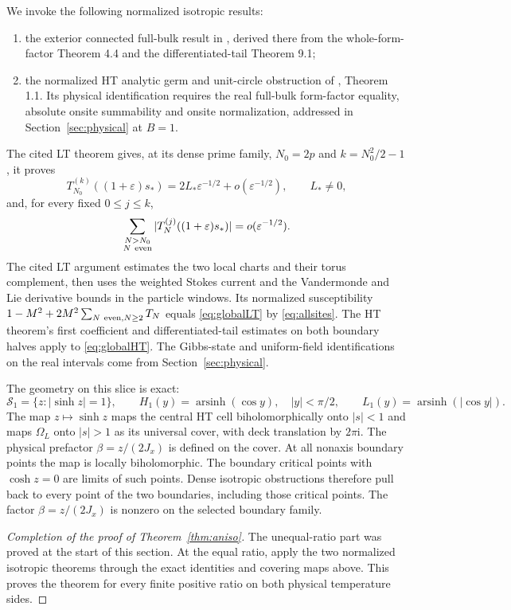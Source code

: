 \documentclass[11pt]{article}
\numberwithin{equation}{section}
\theoremstyle{definition}
\newcommand{\ii}{\mathrm i}
\newcommand{\eps}{\varepsilon}
\newcommand{\cS}{\mathcal S}
\newcommand{\OL}{\Omega_L}
\begin{document}
We invoke the following normalized isotropic results:
\begin{enumerate}
\item the exterior connected full-bulk result in
\cite[Corollary 9.3]{LTsource}, derived there from the
whole-form-factor Theorem 4.4 and the differentiated-tail Theorem 9.1;
\item the normalized HT analytic germ and unit-circle obstruction of
\cite{HTsource}, Theorem 1.1. Its physical identification requires the
real full-bulk form-factor equality, absolute onsite summability and
onsite normalization, addressed in Section~\ref{sec:physical} at $B=1$.
\end{enumerate}
The cited LT theorem gives, at its dense prime family,
$N_0=2p$ and $k=N_0^2/2-1$, it proves
\[
 T_{N_0}^{(k)}((1+\eps)s_*)
 =2L_*\eps^{-1/2}+o(\eps^{-1/2}),\qquad L_*\ne0,
\]
and, for every fixed $0\le j\le k$,
\[
 \sum_{\substack{N>N_0\\N\ {\rm even}}}
 |T_N^{(j)}((1+\eps)s_*)|=o(\eps^{-1/2}).
\]
The cited LT argument estimates the two local charts and their torus
complement, then uses the weighted Stokes current and the
Vandermonde and Lie derivative bounds in the particle windows.
Its normalized susceptibility
$1-M^2+2M^2\sum_{N\ {\rm even},N\ge2}T_N$ equals
\eqref{eq:globalLT} by \eqref{eq:allsites}. The HT theorem's first
coefficient and differentiated-tail estimates on both boundary halves
apply to \eqref{eq:globalHT}. The Gibbs-state and uniform-field
identifications on the real intervals come from
Section~\ref{sec:physical}.

The geometry on this slice is exact:
\[
 \cS_1=\{z:|\sinh z|=1\},\qquad
 H_1(y)=\operatorname{arsinh}(\cos y),\quad |y|<\pi/2,
 \qquad L_1(y)=\operatorname{arsinh}(|\cos y|).
\]
The map $z\mapsto\sinh z$ maps the central HT cell biholomorphically
onto $|s|<1$ and maps $\OL$ onto $|s|>1$ as its universal cover,
with deck translation by $2\pi\ii$. The physical prefactor
$\beta=z/(2J_x)$ is defined on the cover. At all nonaxis boundary
points the
map is locally biholomorphic. The boundary critical points with
$\cosh z=0$ are limits of such points. Dense isotropic obstructions
therefore pull back to every point of the two boundaries, including
those critical points. The factor $\beta=z/(2J_x)$ is nonzero on the
selected boundary family.

\begin{proof}[Completion of the proof of Theorem~\ref{thm:aniso}]
The unequal-ratio part was proved at the start of this section. At the equal ratio,
apply the two normalized isotropic theorems through the exact
identities and covering maps above. This proves the theorem for every
finite positive ratio on
both physical temperature sides.
\end{proof}
\end{document}
